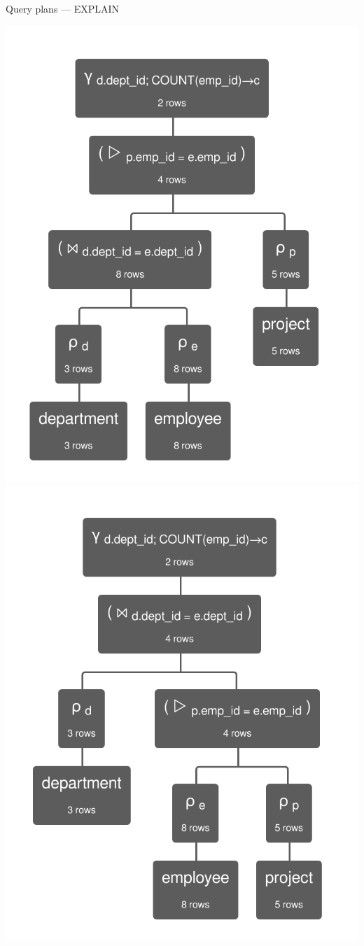 \documentclass[12pt]{beamer}
\begin{document}
\begin{frame}[fragile]{Query plans --- EXPLAIN}
\centerline{
\includegraphics[scale=.2]{query3.png}
\includegraphics[scale=.2]{query4.png}
}
\end{frame}
\end{document}
